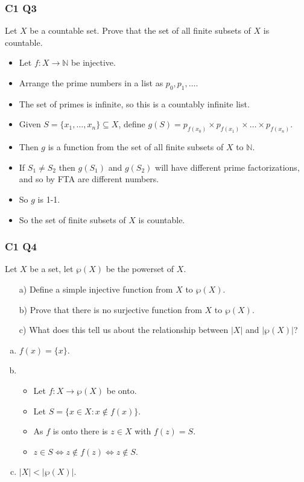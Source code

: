 \documentclass[handout]{beamer}
\newcommand{\bN}{\mathbb{N}}
\begin{document}
\begin{frame}
\frametitle{C1 Q3}
Let $X$ be a countable set. Prove that the set of all finite subsets of $X$ is countable. 
\begin{itemize}
\item Let $f:X\to \bN$ be injective. 
\item Arrange the prime numbers in a list as $p_0,p_1,\ldots$. 
\item The set of primes is infinite, so this is a countably infinite list. 
\item Given $S=\{x_1,\ldots,x_n\}\subseteq X$, define $g(S)= p_{f(x_0)}\times p_{f(x_1)}\times\ldots\times p_{f(x_n)}$. 
\item Then $g$ is a function from the set of all finite subsets of $X$ to $\bN$. 
\item If $S_1\neq S_2$ then $g(S_1)$ and $g(S_2)$ will have different prime factorizations, and so by FTA are different numbers.
\item So $g$ is 1-1.
\item So the set of finite subsets of $X$ is countable.
\end{itemize}
\end{frame}


\begin{frame}
\frametitle{C1 Q4}
Let $X$ be a set, let $\wp(X)$ be the powerset of $X$.
\begin{enumerate}
\item[a)] Define a simple injective function from $X$ to $\wp(X)$.
\item[b)] Prove that there is no surjective function from $X$ to $\wp(X)$. 
\item[c)] What does this tell us about the relationship between $|X|$ and $|\wp(X)|$?
\end{enumerate} 
\begin{enumerate}[a)]
\item $f(x) = \{x\}$.
\item \begin{itemize}
\item Let $f:X\to \wp(X)$ be onto.
\item Let $S=\{x\in X: x\notin f(x)\}$. 
\item As $f$ is onto there is $z\in X$ with $f(z) = S$.
\item $z\in S \iff z\notin f(z)\iff z\notin S$.
\end{itemize}
\item $|X|<|\wp(X)|$.
\end{enumerate}
\end{frame}
\end{document}

